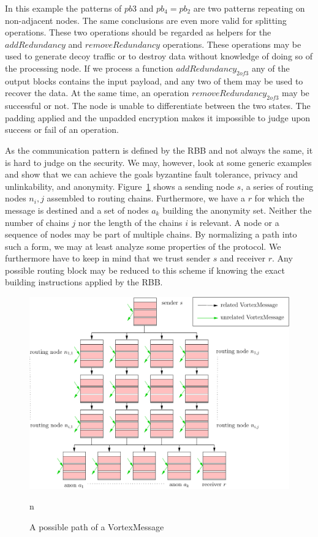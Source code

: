 \documentclass[acmsmall, screen, final]{acmart}
\begin{document}
	In this example the patterns of $pb3$ and $pb_4=pb_2$ are two patterns repeating on non-adjacent nodes. The same conclusions are even more valid for splitting operations. These two operations should be regarded as helpers for the $addRedundancy$ and $removeRedundancy$ operations. These operations may be used to generate decoy traffic or to destroy data without knowledge of doing so of the processing node. If we process a function $addRedundancy_{2 of 3}$ any of the output blocks contains the input payload, and any two of them may be used to recover the data. At the same time, an operation $removeRedundancy_{2 of 3}$ may be successful or not. The node is unable to differentiate between the two states. The padding applied and the unpadded encryption makes it impossible to judge upon success or fail of an operation.
	
	As the communication pattern is defined by the RBB and not always the same, it is hard to judge on the security. We may, however, look at some generic examples and show that we can achieve the goals byzantine fault tolerance, privacy and unlinkability, and anonymity. Figure~\ref{fig:messagePaths} shows a sending node $s$, a series of routing nodes $n_i,j$ assembled to routing chains. Furthermore, we have a $r$ for which the message is destined and a set of nodes $a_k$ building the anonymity set. Neither the number of chains $j$ nor the length of the chains $i$ is relevant. A node or a sequence of nodes may be part of multiple chains. By normalizing a path into such a form, we may at least analyze some properties of the protocol. We furthermore have to keep in mind that we trust sender $s$ and receiver $r$. Any possible routing block may be reduced to this scheme if knowing the exact building instructions applied by the RBB.
	
	\begin{figure}[ht]
		\centering\includegraphics[width=0.7\columnwidth]{messagePaths}
		\caption{A possible path of a VortexMessage}
		n
		\label{fig:messagePaths}
	\end{figure}
	
\end{document}
